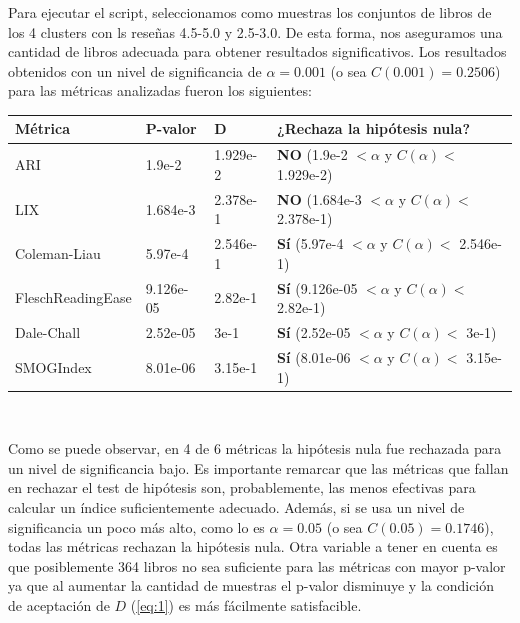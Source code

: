 \documentclass[12pt,journal,compsoc]{IEEEtran}
\begin{document}
Para ejecutar el script, seleccionamos como muestras los conjuntos de libros de los 4 clusters con ls reseñas 4.5-5.0 y 2.5-3.0. De esta forma, nos aseguramos una cantidad de libros adecuada para obtener resultados significativos. Los resultados obtenidos con un nivel de significancia de $\alpha = 0.001$ (o sea $C(0.001) = 0.2506$) para las métricas analizadas fueron los siguientes:\\
\begin{center}
  \centering
  \begin{tabular}{ | l | l | l | l | }
  \hline
  Métrica & P-valor & D & ¿Rechaza la hipótesis nula?\\
  \hline
  ARI & 1.9e-2 & 1.929e-2 & \textbf{NO} (1.9e-2 $< \alpha$ y $C(\alpha) <$ 1.929e-2)\\
  \hline
  LIX & 1.684e-3 & 2.378e-1 & \textbf{NO} (1.684e-3 $< \alpha$ y $C(\alpha) <$ 2.378e-1)\\
  \hline
  Coleman-Liau & 5.97e-4 & 2.546e-1 & \textbf{Sí} (5.97e-4 $< \alpha$ y $C(\alpha) <$ 2.546e-1)\\
  \hline
  FleschReadingEase & 9.126e-05 & 2.82e-1 & \textbf{Sí} (9.126e-05 $< \alpha$ y $C(\alpha) <$ 2.82e-1)\\
  \hline
  Dale-Chall & 2.52e-05 & 3e-1 & \textbf{Sí} (2.52e-05 $< \alpha$ y $C(\alpha) <$ 3e-1)\\
  \hline
  SMOGIndex & 8.01e-06 & 3.15e-1 & \textbf{Sí} (8.01e-06 $< \alpha$ y $C(\alpha) <$ 3.15e-1)\\
  \hline
  \end{tabular}
\end{center}

~

Como se puede observar, en 4 de 6 métricas la hipótesis nula fue rechazada para un nivel de significancia bajo. Es importante remarcar que las métricas que fallan en rechazar el test de hipótesis son, probablemente, las menos efectivas para calcular un índice suficientemente adecuado. Además, si se usa un nivel de significancia un poco más alto, como lo es $\alpha = 0.05$ (o sea $C(0.05) = 0.1746$), todas las métricas rechazan la hipótesis nula. Otra variable a tener en cuenta es que posiblemente 364 libros no sea suficiente para las métricas con mayor p-valor ya que al aumentar la cantidad de muestras el p-valor disminuye y la condición de aceptación de $D$ (\ref{eq:1}) es más fácilmente satisfacible.
\end{document}
